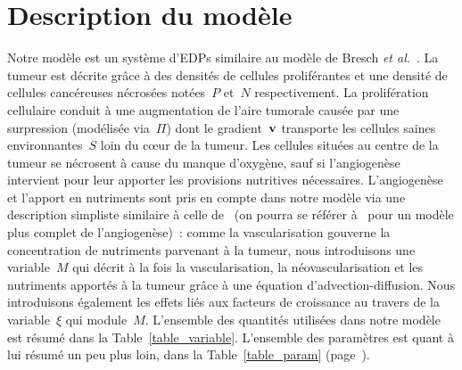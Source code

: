 \documentclass[main.tex]{subfiles}
\begin{document}
\section{Description du modèle}

Notre modèle est un système d'EDPs similaire au modèle de 
Bresch {\it et al.}~\cite{Bresch2010}. 
La tumeur est décrite grâce à des densités de cellules proliférantes et une densité de cellules cancéreuses nécrosées notées~$P$ et~$N$ respectivement. 
La prolifération cellulaire conduit à une augmentation de l'aire tumorale causée par une surpression (modélisée via~$\Pi$) dont le gradient~$\mathbf{v}$ transporte les cellules saines environnantes~$S$ loin du c\oe{}ur de la tumeur. 
Les cellules situées au centre de la tumeur se nécrosent à cause du manque d'oxygène, sauf si l'angiogenèse intervient pour leur apporter les provisions nutritives nécessaires.
L'angiogenèse et l'apport en nutriments sont pris en compte dans notre modèle via une description simpliste similaire à celle de~\cite{Fathallah2013,Billy2009545} (on pourra se référer à~\cite{macklin2009multiscale} pour un modèle plus complet de l'angiogenèse)~: comme la vascularisation gouverne la concentration de nutriments parvenant à la tumeur, nous introduisons une variable~$M$ 
qui décrit à la fois la vascularisation, la néovascularisation et les nutriments apportés à la tumeur grâce à une équation d'advection-diffusion. 
Nous introduisons également les effets liés aux facteurs de croissance au travers de la variable~$\xi$ qui module~$M$. L'ensemble des quantités utilisées dans notre modèle est résumé dans la Table~\ref{table_variable}. L'ensemble des paramètres est quant à lui résumé un peu plus loin, dans la Table~\ref{table_param} (page~\pageref{table_param}). 
\end{document}
